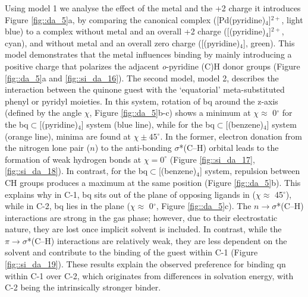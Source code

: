 \documentclass[../../main.tex]{subfiles}
\begin{document}
Using model 1 we analyse the effect of the metal and the +2 charge it introduces Figure \ref{fig::da_5}a, by comparing the canonical complex ([Pd(pyridine)$_4$]$^{2+}$,  light blue) to a complex without metal and an overall +2 charge ([(pyridine)$_4$]$^{2+}$, cyan), and without metal and an overall zero charge ([(pyridine)$_4$], green). This model demonstrates that the metal influences binding by mainly introducing a positive charge that polarizes the adjacent \emph{o}-pyridine (C)H donor groups (Figure \ref{fig::da_5}a and \ref{fig::si_da_16}). The second model, model 2, describes the interaction between the quinone guest with the `equatorial' meta-substituted phenyl or pyridyl moieties. In this system, rotation of bq around the z-axis (defined by the angle $\chi$, Figure \ref{fig::da_5}b-c) shows a minimum at $\chi \approx$ 0${}^\circ$ for the bq$\subset$[(pyridine)${}_4$] system (blue line), while for the bq$\subset$[(benzene)${}_4$] system (orange line), minima are found at $\chi \pm 45{}^\circ$. In the former, electron donation from the nitrogen lone pair ($n$) to the anti-bonding $\sigma$*(C–H) orbital leads to the formation of weak hydrogen bonds at $\chi = 0^\circ$ (Figure \ref{fig::si_da_17}, \ref{fig::si_da_18}).\cite{Lewis2013} In contrast, for the bq$\subset$[(benzene)$_4$] system, repulsion between CH groups produces a maximum at the same position (Figure \ref{fig::da_5}b). This explains why in C-1, bq sits out of the plane of opposing ligands in ($\chi \approx$ 45${}^\circ$), while in C-2, bq lies in the plane ($\chi \approx$ 0${}^\circ$, Figure \ref{fig::da_5}c). The $n \rightarrow \sigma$*(C–H) interactions are strong in the gas phase; however, due to their electrostatic nature, they are lost once implicit solvent is included. In contrast, while the $\pi \rightarrow \sigma$*(C–H) interactions are relatively weak, they are less dependent on the solvent and contribute to the binding of the guest within C-1 (Figure \ref{fig::si_da_19}). These results explain the observed preference for binding qn within C-1 over C-2, which originates from differences in solvation energy, with C-2 being the intrinsically stronger binder. 
\end{document}
